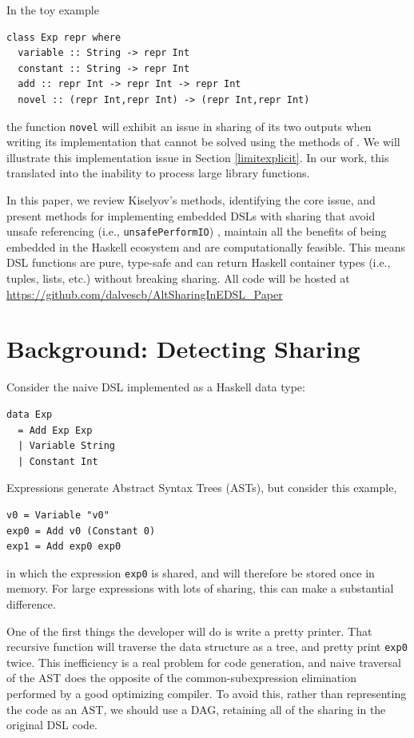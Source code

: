 \documentclass[runningheads]{llncs}
\begin{document}
In the toy example
\begin{verbatim}
class Exp repr where
  variable :: String -> repr Int
  constant :: String -> repr Int
  add :: repr Int -> repr Int -> repr Int
  novel :: (repr Int,repr Int) -> (repr Int,repr Int)
\end{verbatim}
the function \texttt{novel} will exhibit an issue in sharing of
its two outputs when writing its implementation that cannot be solved using
the methods of \cite{kiselyov:sharing}. We will illustrate this implementation
issue in Section \ref{limitexplicit}. In our work, this translated into the
inability to process large library functions.

\smallskip
In this paper, we review Kiselyov's methods, identifying the core issue, and
present methods for implementing embedded DSLs with sharing that avoid  unsafe referencing (i.e., \texttt{unsafePerformIO}) \cite{gill:observablesharing}, maintain all the benefits of being embedded in the Haskell ecosystem and are computationally feasible. This
means DSL functions are pure, type-safe and can return Haskell container types (i.e.,
tuples, lists, etc.) without breaking sharing. All code will be hosted at \url{https://github.com/dalvescb/AltSharingInEDSL_Paper}

\section{Background: Detecting Sharing}

Consider the naive DSL implemented as a Haskell data type:
\begin{verbatim}
data Exp
  = Add Exp Exp
  | Variable String
  | Constant Int
\end{verbatim}
Expressions generate Abstract Syntax Trees (ASTs),
but consider this example,
\begin{verbatim}
v0 = Variable "v0"
exp0 = Add v0 (Constant 0)
exp1 = Add exp0 exp0
\end{verbatim}
in which the expression  \texttt{exp0} is shared,
and will therefore be stored once in memory.
For large expressions with lots of sharing,
this can make a substantial difference.

One of the first things the developer will do is write a pretty printer.
That recursive function will traverse the data structure as a tree,
and pretty print \texttt{exp0} twice.
This inefficiency is a real problem for code generation,
and naive traversal of the AST does the opposite of the common-subexpression elimination performed by a good optimizing compiler.
To avoid this,
rather than representing the code as an AST, 
we should use a DAG, retaining all of the sharing in the original DSL code. 
\end{document}
